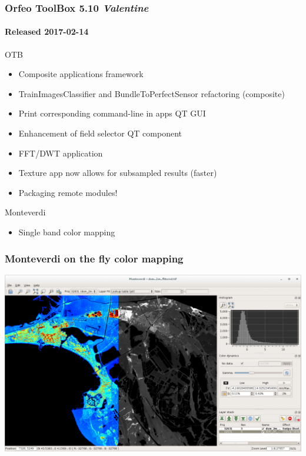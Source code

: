\documentclass[smaller]{beamer}
\begin{document}
\begin{frame}
\frametitle{Orfeo ToolBox 5.10 \textit{Valentine}}
\framesubtitle{Released 2017-02-14}
  \begin{block}{OTB}
    \begin{itemize}
      \item Composite applications framework
      \item TrainImagesClassifier and BundleToPerfectSensor refactoring (composite)
      \item Print corresponding command-line in apps QT GUI
      \item Enhancement of field selector QT component
      \item FFT/DWT application
      \item Texture app now allows for subsampled results (faster)
      \item Packaging remote modules!
    \end{itemize}
  \end{block}

  \begin{block}{Monteverdi}
    \begin{itemize}
      \item Single band color mapping
      \end{itemize}
  \end{block}

\end{frame}

\begin{frame}
\frametitle{Monteverdi on the fly color mapping}
\includegraphics[width=1\textwidth]{images/monteverdi-colormapping.png}
\end{frame}
\end{document}

